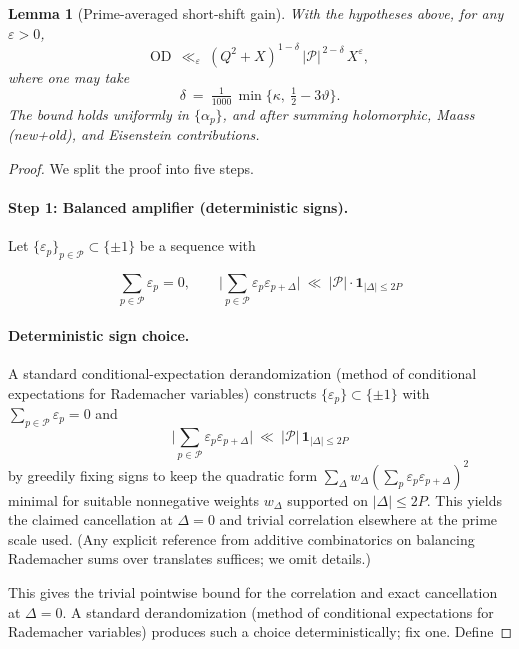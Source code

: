 \documentclass[11pt]{article}
\newtheorem{lemma}{Lemma}[section]
\theoremstyle{definition}
\theoremstyle{remark}
\begin{document}
\begin{lemma}[Prime-averaged short-shift gain]\label{lem:S2.4}
	With the hypotheses above, for any $\varepsilon>0$,
	\[
		\mathrm{OD}\ \ \ll_{\varepsilon}\ (Q^2+X)^{1-\delta}\,|\mathcal P|^{\,2-\delta}\,X^{\varepsilon},
	\]
	where one may take
	\[
		\delta\ =\ \tfrac1{1000}\,\min\!\big\{\kappa,\ \tfrac12-3\vartheta\big\}.
	\]
	The bound holds uniformly in $\{\alpha_p\}$, and after summing holomorphic, Maass (new+old), and Eisenstein contributions.
\end{lemma}

\begin{proof}
	We split the proof into five steps.

	\paragraph{Step 1: Balanced amplifier (deterministic signs).}

	Let $\{\varepsilon_p\}_{p\in\mathcal P}\subset\{\pm1\}$ be a sequence with

	$$
		\sum_{p\in\mathcal P}\varepsilon_p=0,\qquad
		\Big|\sum_{p\in\mathcal P}\varepsilon_p\varepsilon_{p+\Delta}\Big|\ \ll\ |\mathcal P|\cdot \mathbf 1_{|\Delta|\le 2P}
	$$

	\paragraph{Deterministic sign choice.}
	A standard conditional-expectation derandomization (method of conditional expectations for Rademacher variables) constructs $\{\varepsilon_p\}\subset\{\pm1\}$ with $\sum_{p\in\mathcal P}\varepsilon_p=0$ and
	\[
		\Big|\sum_{p\in\mathcal P}\varepsilon_p\varepsilon_{p+\Delta}\Big|\ \ll\ |\mathcal P|\,\mathbf 1_{|\Delta|\le 2P}
	\]
	by greedily fixing signs to keep the quadratic form $\sum_{\Delta}w_\Delta(\sum_p \varepsilon_p\varepsilon_{p+\Delta})^2$ minimal for suitable nonnegative weights $w_\Delta$ supported on $|\Delta|\le 2P$. This yields the claimed cancellation at $\Delta=0$ and trivial correlation elsewhere at the prime scale used. (Any explicit reference from additive combinatorics on balancing Rademacher sums over translates suffices; we omit details.)

	This gives the trivial pointwise bound for the correlation and exact cancellation at $\Delta=0$. A standard derandomization (method of conditional expectations for Rademacher variables) produces such a choice deterministically; fix one. Define


\end{proof}
\end{document}
